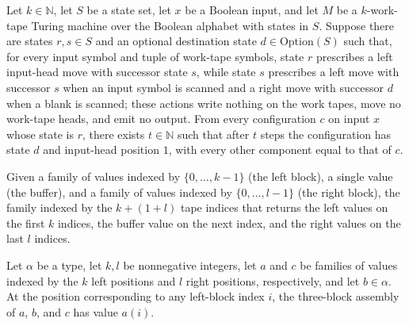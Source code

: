 \begin{lemma}
\label{Turing.FinTM.rewind_from_any}
\leanok
{}
Let $k \in \mathbb{N}$, let $S$ be a state set, let $x$ be a Boolean input, and let $M$
be a $k$-work-tape Turing machine over the Boolean alphabet with states in $S$. Suppose
there are states $r,s \in S$ and an optional destination state $d \in
\mathrm{Option}(S)$ such that, for every input symbol and tuple of work-tape symbols,
state $r$ prescribes a left input-head move with successor state $s$, while state $s$
prescribes a left move with successor $s$ when an input symbol is scanned and a right
move with successor $d$ when a blank is scanned; these actions write nothing on the work
tapes, move no work-tape heads, and emit no output. From every configuration $c$ on
input $x$ whose state is $r$, there exists $t \in \mathbb{N}$ such that after $t$ steps
the configuration has state $d$ and input-head position $1$, with every other component
equal to that of $c$.
\end{lemma}

\begin{definition}
\label{Turing.FinTM.tapeBlocks}
\leanok
Given a family of values indexed by $\{0,\dots,k-1\}$ (the left block), a
single value (the buffer), and a family of values indexed by
$\{0,\dots,l-1\}$ (the right block), the family indexed by the $k + (1 + l)$
tape indices that returns the left values on the first $k$ indices, the
buffer value on the next index, and the right values on the last $l$ indices.
\end{definition}

\begin{lemma}
\label{Turing.FinTM.tapeBlocks_left}
\leanok
{}
Let $\alpha$ be a type, let $k,l$ be nonnegative integers, let $a$ and $c$ be families
of values indexed by the $k$ left positions and $l$ right positions, respectively, and
let $b\in\alpha$. At the position corresponding to any left-block index $i$, the
three-block assembly of $a$, $b$, and $c$ has value $a(i)$.
\end{lemma}

